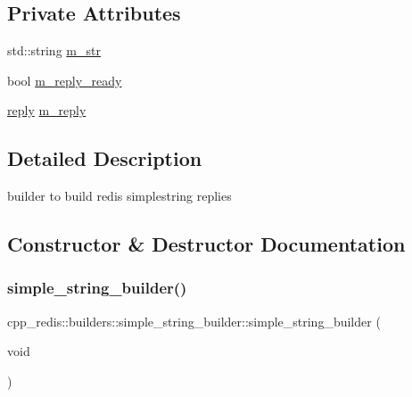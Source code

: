 \subsection*{Private Attributes}
\begin{DoxyCompactItemize}
\item 
std\+::string \hyperlink{classcpp__redis_1_1builders_1_1simple__string__builder_acf61d3d6bec2cc33279f4e6ee4cd6f80}{m\+\_\+str}
\item 
bool \hyperlink{classcpp__redis_1_1builders_1_1simple__string__builder_aaf2076e8d2d7154ddc1433aff77a5013}{m\+\_\+reply\+\_\+ready}
\item 
\hyperlink{classcpp__redis_1_1reply}{reply} \hyperlink{classcpp__redis_1_1builders_1_1simple__string__builder_a8a9ee04b09475ab079db623f1d887757}{m\+\_\+reply}
\end{DoxyCompactItemize}


\subsection{Detailed Description}
builder to build redis simplestring replies 

\subsection{Constructor \& Destructor Documentation}
\mbox{\label{classcpp__redis_1_1builders_1_1simple__string__builder_a51fcb7777a78cbd3599aae8896e4d06a}} 
\subsubsection{\texorpdfstring{simple\+\_\+string\+\_\+builder()}{simple\_string\_builder()}\hspace{0.1cm}{\footnotesize\ttfamily [1/2]}}
{\footnotesize\ttfamily cpp\+\_\+redis\+::builders\+::simple\+\_\+string\+\_\+builder\+::simple\+\_\+string\+\_\+builder (\begin{DoxyParamCaption}\item[{void}]{ }\end{DoxyParamCaption})}



